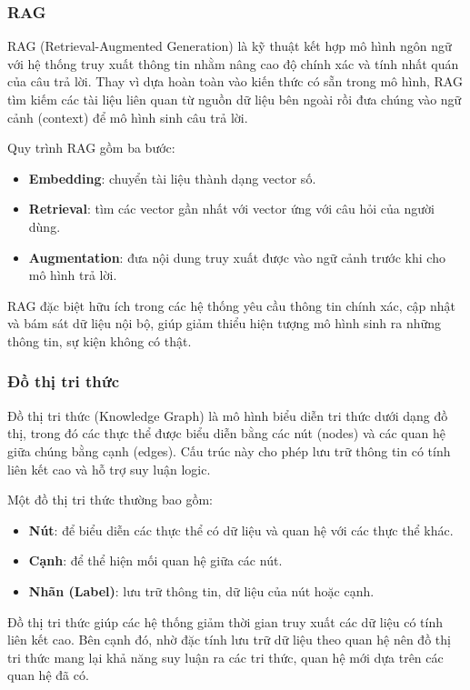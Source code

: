 \subsubsection{RAG}
RAG (Retrieval-Augmented Generation) là kỹ thuật kết hợp mô hình ngôn ngữ với hệ thống truy xuất thông tin nhằm nâng cao độ chính xác và tính nhất quán của câu trả lời. Thay vì dựa hoàn toàn vào kiến thức có sẵn trong mô hình, RAG tìm kiếm các tài liệu liên quan từ nguồn dữ liệu bên ngoài rồi đưa chúng vào ngữ cảnh (context) để mô hình sinh câu trả lời\cite{c4-rag}.

Quy trình RAG gồm ba bước:
\begin{itemize}
    \item \textbf{Embedding}: chuyển tài liệu thành dạng vector số\cite{c4-rag}.
    \item \textbf{Retrieval}: tìm các vector gần nhất với vector ứng với câu hỏi của người dùng\cite{c4-rag}.
    \item \textbf{Augmentation}: đưa nội dung truy xuất được vào ngữ cảnh trước khi cho mô hình trả lời\cite{c4-rag}.
\end{itemize}

RAG đặc biệt hữu ích trong các hệ thống yêu cầu thông tin chính xác, cập nhật và bám sát dữ liệu nội bộ, giúp giảm thiểu hiện tượng mô hình sinh ra những thông tin, sự kiện không có thật\cite{c4-rag}.



\subsubsection{Đồ thị tri thức}
Đồ thị tri thức (Knowledge Graph) là mô hình biểu diễn tri thức dưới dạng đồ thị, trong đó các thực thể được biểu diễn bằng các nút (nodes) và các quan hệ giữa chúng bằng cạnh (edges)\cite{c4-kg}. Cấu trúc này cho phép lưu trữ thông tin có tính liên kết cao và hỗ trợ suy luận logic.

Một đồ thị tri thức thường bao gồm:
\begin{itemize}
    \item \textbf{Nút}: để biểu diễn các thực thể có dữ liệu và quan hệ với các thực thể khác\cite{c4-kg}.
    \item \textbf{Cạnh}: để thể hiện mối quan hệ giữa các nút\cite{c4-kg}.
    \item \textbf{Nhãn (Label)}: lưu trữ thông tin, dữ liệu của nút hoặc cạnh\cite{c4-kg}.
\end{itemize}

Đồ thị tri thức giúp các hệ thống giảm thời gian truy xuất các dữ liệu có tính liên kết cao. Bên cạnh đó, nhờ đặc tính lưu trữ dữ liệu theo quan hệ nên đồ thị tri thức mang lại khả năng suy luận ra các tri thức, quan hệ mới dựa trên các quan hệ đã có.



